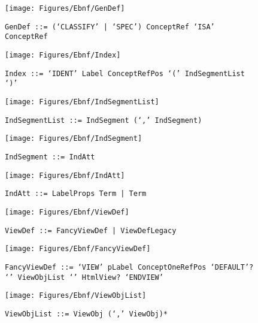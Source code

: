  \begin{figure}[H]
  \centering
  \texttt{[image: Figures/Ebnf/GenDef]}
  \caption*{\texttt{GenDef \small::=  (`CLASSIFY' | `SPEC') ConceptRef `ISA' ConceptRef}}
  \label{fig:ebnf-GenDef}
 \end{figure}

 \begin{figure}[H]
  \centering
  \texttt{[image: Figures/Ebnf/Index]}
  \caption*{\texttt{Index \small::=  `IDENT' Label ConceptRefPos `(' IndSegmentList `)'}}
  \label{fig:ebnf-Index}
 \end{figure}

 \begin{figure}[H]
  \centering
  \texttt{[image: Figures/Ebnf/IndSegmentList]}
  \caption*{\texttt{IndSegmentList \small::=  IndSegment (`,' IndSegment)}}
  \label{fig:ebnf-IndSegmentList}
 \end{figure}

 \begin{figure}[H]
  \centering
  \texttt{[image: Figures/Ebnf/IndSegment]}
  \caption*{\texttt{IndSegment \small::=  IndAtt}}
  \label{fig:ebnf-IndSegment}
 \end{figure}

 \begin{figure}[H]
  \centering
  \texttt{[image: Figures/Ebnf/IndAtt]}
  \caption*{\texttt{IndAtt \small::=  LabelProps Term | Term}}
  \label{fig:ebnf-IndAtt}
 \end{figure}

 \begin{figure}[H]
  \centering
  \texttt{[image: Figures/Ebnf/ViewDef]}
  \caption*{\texttt{ViewDef \small::=  FancyViewDef | ViewDefLegacy}}
  \label{fig:ebnf-ViewDef}
 \end{figure}

 \begin{figure}[H]
  \centering
  \texttt{[image: Figures/Ebnf/FancyViewDef]}
  \caption*{\texttt{FancyViewDef \small::=  `VIEW' pLabel ConceptOneRefPos `DEFAULT'? `{' ViewObjList `}' HtmlView? `ENDVIEW'}}
  \label{fig:ebnf-FancyViewDef}
 \end{figure}

 \begin{figure}[H]
  \centering
  \texttt{[image: Figures/Ebnf/ViewObjList]}
  \caption*{\texttt{ViewObjList \small::=  ViewObj (`,' ViewObj)*}}
  \label{fig:ebnf-ViewObjList}
 \end{figure}

